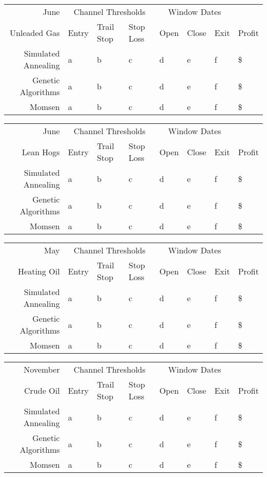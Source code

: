 \documentclass[10pt]{article}
\begin{document}
\begin{tabular}{|r|l|l|l|l|l|l|l|}
  \hline
  June & \multicolumn{3}{|c|}{Channel Thresholds} & \multicolumn{3}{|c|}{Window Dates} &  \\
  Unleaded Gas & Entry & Trail Stop & Stop Loss & Open & Close & Exit & Profit\\ \hline
  Simulated Annealing & a & b & c & d & e & f & \$ \\ \hline
  Genetic Algorithms & a & b & c & d & e & f & \$ \\ \hline
  Momsen &  a & b & c & d & e & f & \$ \\ \hline
\end{tabular}

\begin{tabular}{|r|l|l|l|l|l|l|l|}
  \hline
  June & \multicolumn{3}{|c|}{Channel Thresholds} & \multicolumn{3}{|c|}{Window Dates} &  \\
  Lean Hogs & Entry & Trail Stop & Stop Loss & Open & Close & Exit & Profit\\ \hline
  Simulated Annealing & a & b & c & d & e & f & \$ \\ \hline
  Genetic Algorithms & a & b & c & d & e & f & \$ \\ \hline
  Momsen &  a & b & c & d & e & f & \$ \\ \hline
\end{tabular}

\begin{tabular}{|r|l|l|l|l|l|l|l|}
  \hline
  May & \multicolumn{3}{|c|}{Channel Thresholds} & \multicolumn{3}{|c|}{Window Dates} &  \\
  Heating Oil & Entry & Trail Stop & Stop Loss & Open & Close & Exit & Profit\\ \hline
  Simulated Annealing & a & b & c & d & e & f & \$ \\ \hline
  Genetic Algorithms & a & b & c & d & e & f & \$ \\ \hline
  Momsen &  a & b & c & d & e & f & \$ \\ \hline
\end{tabular}

\begin{tabular}{|r|l|l|l|l|l|l|l|}
  \hline
  November & \multicolumn{3}{|c|}{Channel Thresholds} & \multicolumn{3}{|c|}{Window Dates} &  \\
  Crude Oil & Entry & Trail Stop & Stop Loss & Open & Close & Exit & Profit\\ \hline
  Simulated Annealing & a & b & c & d & e & f & \$ \\ \hline
  Genetic Algorithms & a & b & c & d & e & f & \$ \\ \hline
  Momsen &  a & b & c & d & e & f & \$ \\ \hline
\end{tabular}
\end{document}
